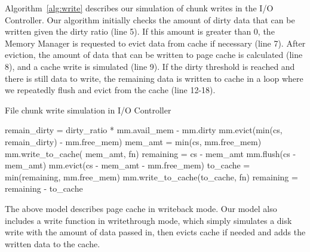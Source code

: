 Algorithm~\ref{alg:write} describes our simulation of chunk writes in
the I/O Controller.
Our algorithm initially checks the  amount of dirty data that
can be written given the dirty ratio (line 5).
If this amount is greater than 0, the Memory Manager is requested to evict
data from cache if necessary (line 7).
After eviction, the amount of data that can be written to
page cache is calculated (line 8), and a cache write is simulated (line 9).
If the dirty threshold is reached and there is still data to write,
the remaining data is written to cache in a loop
where we repeatedly flush and evict from the cache (line 12-18).

\begin{algorithm}[H]
\caption{File chunk write simulation in I/O Controller}
\label{alg:write}
    \small
    \begin{algorithmic}[1]
        \Input
           \EndInput
        \State remain\_dirty = dirty\_ratio * mm.avail\_mem - mm.dirty
         
            \State mm.evict(min(cs, remain\_dirty) - mm.free\_mem)
            \State mem\_amt = min(cs, mm.free\_mem)
            \State mm.write\_to\_cache( mem\_amt, fn)
        \EndIf
        \State remaining = cs - mem\_amt
          
            \State mm.flush(cs - mem\_amt)
            \State mm.evict(cs - mem\_amt  - mm.free\_mem)
            \State to\_cache = min(remaining, mm.free\_mem)
            \State mm.write\_to\_cache(to\_cache, fn)
            \State remaining = remaining - to\_cache
        \EndWhile

    \end{algorithmic}
\end{algorithm}

The above model describes page cache in writeback
mode. Our model also includes a write function in writethrough mode,
which simply simulates a disk write with the amount of data passed in,
then evicts cache if needed and adds the written data to the cache.